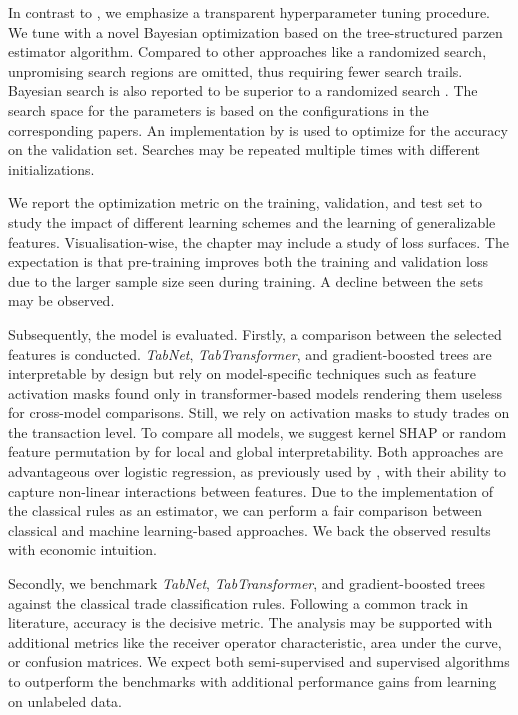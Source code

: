 In contrast to \textcite{ronenMachineLearningTrade2022}, we emphasize a transparent hyperparameter tuning procedure. We tune with a novel Bayesian optimization based on the tree-structured parzen estimator algorithm. Compared to other approaches like a randomized search, unpromising search regions are omitted, thus requiring fewer search trails. Bayesian search is also reported to be superior to a randomized search \autocite{turnerBayesianOptimizationSuperior2021}. The search space for the parameters is based on the configurations in the corresponding papers. An implementation by \textcite{akibaOptunaNextgenerationHyperparameter2019} is used to optimize for the accuracy on the validation set. Searches may be repeated multiple times with different initializations.

We report the optimization metric on the training, validation, and test set to study the impact of different learning schemes and the learning of generalizable features. Visualisation-wise, the chapter may include a study of loss surfaces. The expectation is that pre-training improves both the training and validation loss due to the larger sample size seen during training. A decline between the sets may be observed.

Subsequently, the model is evaluated. Firstly, a comparison between the selected features is conducted. \textit{TabNet}, \textit{TabTransformer}, and gradient-boosted trees are interpretable by design but rely on model-specific techniques such as feature activation masks found only in transformer-based models rendering them useless for cross-model comparisons. Still, we rely on activation masks to study trades on the transaction level. To compare all models, we suggest kernel \gls{SHAP} \autocite{lundbergUnifiedApproachInterpreting2017} or random feature permutation by \textcite{breimanRandomForests2001} for local and global interpretability. Both approaches are advantageous over logistic regression, as previously used by \textcites{savickasInferringDirectionOption2003}{chakrabartyTradeClassificationAlgorithms2012}, with their ability to capture non-linear interactions between features. Due to the implementation of the classical rules as an estimator, we can perform a fair comparison between classical and machine learning-based approaches. We back the observed results with economic intuition.

Secondly, we benchmark \textit{TabNet}, \textit{TabTransformer}, and gradient-boosted trees against the classical trade classification rules. Following a common track in literature, accuracy is the decisive metric. The analysis may be supported with additional metrics like the receiver operator characteristic, area under the curve, or confusion matrices. We expect both semi-supervised and supervised algorithms to outperform the benchmarks with additional performance gains from learning on unlabeled data.

